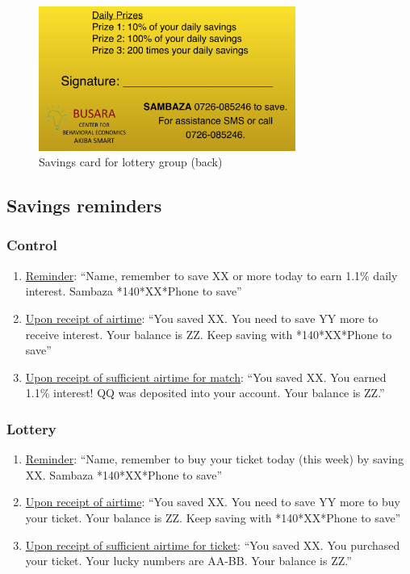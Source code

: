 \documentclass[11pt]{article}
\begin{document}
        \begin{figure}[ht]
        \centering
        \caption{Savings card for lottery group (back)}
        \includegraphics[width=0.75\textwidth]{../../figures/id_back.pdf}
        \end{figure}

    \clearpage

    \subsection{Savings reminders}

        \subsubsection{Control}

            \begin{enumerate}
                \item \underline{Reminder}: ``{Name}, remember to save XX or more today to earn 1.1\% daily interest. Sambaza *140*XX*Phone to save''
                \item \underline{Upon receipt of airtime}: ``You saved XX.  You need to save YY more to receive interest. Your balance is ZZ. Keep saving with *140*XX*Phone to save''
                \item \underline{Upon receipt of sufficient airtime for match}: ``You saved XX.  You earned 1.1\% interest!  QQ was deposited into your account.  Your balance is ZZ.''
            \end{enumerate}

        \subsubsection{Lottery}

            \begin{enumerate}
                \item \underline{Reminder}: ``{Name}, remember to buy your ticket today (this week) by saving XX. Sambaza *140*XX*Phone to save''
                \item \underline{Upon receipt of airtime}: ``You saved XX.  You need to save YY more to buy your ticket. Your balance is ZZ. Keep saving with *140*XX*Phone to save''
                \item \underline{Upon receipt of sufficient airtime for ticket}: ``You saved XX. You purchased your ticket. Your lucky numbers are AA-BB. Your balance is ZZ.''
            \end{enumerate}
\end{document}
